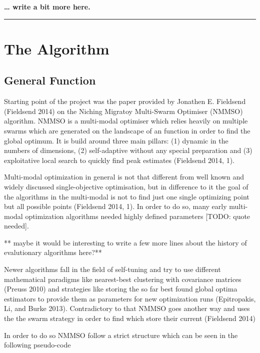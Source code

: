 \documentclass[12pt,a4paper]{article}
\begin{document}
\textbf{\ldots{} write a bit more here.}

\begin{center}\rule{0.5\linewidth}{\linethickness}\end{center}

\section{The Algorithm}\label{the-algorithm}

\subsection{General Function}\label{general-function}

Starting point of the project was the paper provided by Jonathen E.
Fieldsend (Fieldsend 2014) on the Niching Migratoy Multi-Swarm Optimiser
(NMMSO) algorithm. NMMSO is a multi-modal optimiser which relies heavily
on multiple swarms which are generated on the landscape of an function
in order to find the global optimum. It is build around three main
pillars: (1) dynamic in the numbers of dimensions, (2) self-adaptive
without any special preparation and (3) exploitative local search to
quickly find peak estimates (Fieldsend 2014, 1).

Multi-modal optimization in general is not that different from well
known and widely discussed single-objective optimisation, but in
difference to it the goal of the algorithms in the multi-modal is not to
find just one single optimizing point but all possible points (Fieldsend
2014, 1). In order to do so, many early multi-modal optimization
algorithms needed highly defined parameters {[}TODO: quote needed{]}.

** maybe it would be interesting to write a few more lines about the
history of evalutionary algorithms here?**

Newer algorithms fall in the field of self-tuning and try to use
different mathematical paradigms like nearest-best clustering with
covariance matrices (Preuss 2010) and strategies like storing the so far
best found global optima estimators to provide them as parameters for
new optimization runs (Epitropakis, Li, and Burke 2013). Contradictory
to that NMMSO goes another way and uses the the swarm strategy in order
to find which store their current (Fieldsend 2014)

In order to do so NMMSO follow a strict structure which can be seen in
the following pseudo-code
\end{document}
